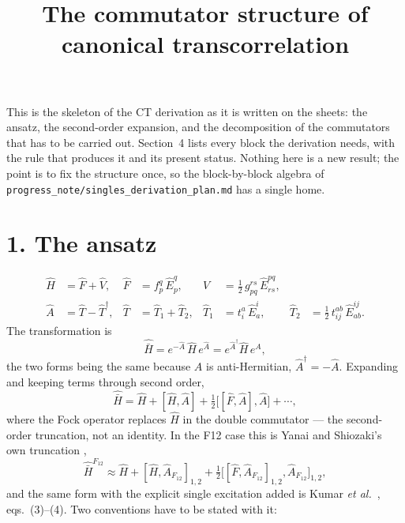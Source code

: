 \documentclass[11pt]{article}
\title{\bfseries The commutator structure of canonical transcorrelation}
\author{}
\date{}
\newcommand{\E}[2]{\hat E^{#1}_{#2}}
\begin{document}
\maketitle
\vspace{-2.5em}

\noindent
This is the skeleton of the CT derivation as it is written on the sheets: the
ansatz, the second-order expansion, and the decomposition of the commutators
that has to be carried out. Section~4 lists every block the derivation needs,
with the rule that produces it and its present status. Nothing here is a new
result; the point is to fix the structure once, so the block-by-block algebra
of \texttt{progress\_note/singles\_derivation\_plan.md} has a single home.

\section*{1. The ansatz}

\begin{align}
  \hat H&=\hat F+\hat V,
   & \hat F&=f^q_p\,\E{q}{p},
   & \hat V&=\tfrac12\,g^{rs}_{pq}\,\E{pq}{rs},
   \label{eq:split}\\[2pt]
  \hat A&=\hat T-\hat T^\dagger,
   & \hat T&=\hat T_1+\hat T_2,
   & \hat T_1&=t^a_i\,\E{i}{a},
   & \hat T_2&=\tfrac12\,t^{ab}_{ij}\,\E{ij}{ab}.
   \label{eq:ansatz}
\end{align}
The transformation is
\begin{equation}
  \hat{\bar H}=e^{-\hat A}\,\hat H\,e^{\hat A}
   =e^{\hat A^\dagger}\hat H\,e^{\hat A},
  \label{eq:transform}
\end{equation}
the two forms being the same because $A$ is anti-Hermitian,
$\hat A^\dagger=-\hat A$. Expanding and keeping terms through second order,
\begin{equation}
  \hat{\bar H}=\hat H+[\hat H,\hat A]
   +\tfrac12\bigl[[\hat F,\hat A],\hat A\bigr]+\cdots,
  \label{eq:second}
\end{equation}
where the Fock operator replaces $\hat H$ in the double commutator --- the
second-order truncation, not an identity. In the F12 case this is Yanai and
Shiozaki's own truncation
\cite{Yanai:2012cj},
\[
  \hat{\bar H}^{F_{12}}
   \approx\hat H+[\hat H,\hat A_{F_{12}}]_{1,2}
   +\tfrac12\bigl[[\hat F,\hat A_{F_{12}}]_{1,2},\hat A_{F_{12}}\bigr]_{1,2},
\]
and the same form with the explicit single excitation added is
Kumar \emph{et al.}\ \cite{Kumar2022}, eqs.~(3)--(4). Two conventions have to be
stated with it:
\end{document}
